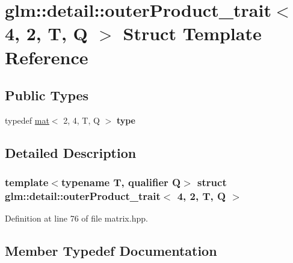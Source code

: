 \hypertarget{structglm_1_1detail_1_1outerProduct__trait_3_014_00_012_00_01T_00_01Q_01_4}{}\section{glm\+:\+:detail\+:\+:outer\+Product\+\_\+trait$<$ 4, 2, T, Q $>$ Struct Template Reference}
\label{structglm_1_1detail_1_1outerProduct__trait_3_014_00_012_00_01T_00_01Q_01_4}
\subsection*{Public Types}
\begin{DoxyCompactItemize}
\item 
\mbox{\label{structglm_1_1detail_1_1outerProduct__trait_3_014_00_012_00_01T_00_01Q_01_4_a147defb160b17d4193e19a64618c035e}} 
typedef \hyperlink{structglm_1_1mat}{mat}$<$ 2, 4, T, Q $>$ {\bfseries type}
\end{DoxyCompactItemize}


\subsection{Detailed Description}
\subsubsection*{template$<$typename T, qualifier Q$>$\newline
struct glm\+::detail\+::outer\+Product\+\_\+trait$<$ 4, 2, T, Q $>$}



Definition at line 76 of file matrix.\+hpp.



\subsection{Member Typedef Documentation}
\mbox{\label{structglm_1_1detail_1_1outerProduct__trait_3_014_00_012_00_01T_00_01Q_01_4_a147defb160b17d4193e19a64618c035e}} 
